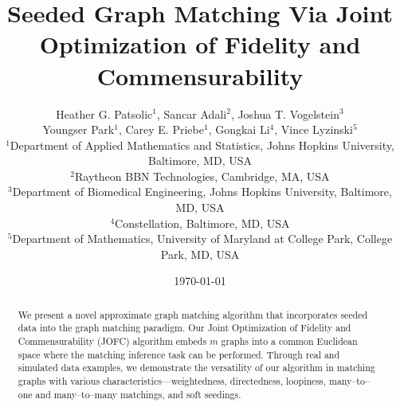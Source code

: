 \documentclass[12pt]{article}
\numberwithin{equation}{section}
\theoremstyle{definition}
\begin{document}
\newcommand{\tab}[0]{\hspace{.1in}}




\title
{Seeded Graph Matching Via Joint Optimization of Fidelity and Commensurability}
\author{Heather G. Patsolic$^{1}$,
    Sancar Adali$^{2}$, Joshua T. Vogelstein$^{3}$\\
    Youngser Park$^{1}$, Carey E. Priebe$^{1}$, 
    Gongkai Li$^{4}$, Vince Lyzinski$^{5}$  \\
\small{$^{1}$Department of Applied Mathematics and Statistics, Johns Hopkins University, Baltimore, MD, USA}\\
\small{$^{2}$Raytheon BBN Technologies, Cambridge, MA, USA}\\
\small{$^{3}$Department of Biomedical Engineering, Johns Hopkins University, Baltimore, MD, USA}\\
\small{$^{4}$Constellation, Baltimore, MD, USA}\\
\small{$^{5}$Department of Mathematics, University of Maryland
    at College Park, College Park, MD, USA}}
\date{\today}
\maketitle

\begin{abstract}
We present a novel approximate graph matching algorithm that incorporates seeded data into the graph matching paradigm.  Our Joint Optimization of Fidelity and Commensurability (JOFC) algorithm embeds $m$ graphs into a common Euclidean space where the matching inference task can be performed.  Through real and simulated data examples, we demonstrate the versatility of our algorithm in matching graphs with various characteristics---weightedness, directedness, loopiness, many--to--one and many--to--many matchings, and soft seedings.
\end{abstract}
\end{document}
